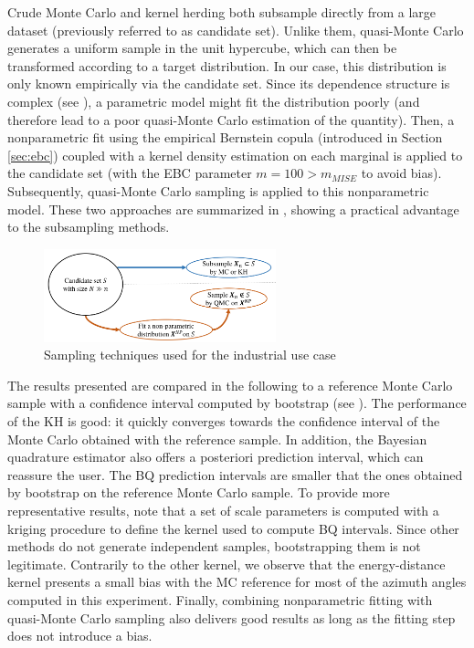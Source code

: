 Crude Monte Carlo and kernel herding both subsample directly from a large dataset (previously referred to as candidate set). 
Unlike them, quasi-Monte Carlo generates a uniform sample in the unit hypercube, which can then be transformed according to a target distribution. 
In our case, this distribution is only known empirically via the candidate set. 
Since its dependence structure is complex (see ), a parametric model might fit the distribution poorly (and therefore lead to a poor quasi-Monte Carlo estimation of the quantity). 
Then, a nonparametric fit using the empirical Bernstein copula (introduced in Section \ref{sec:ebc}) coupled with a kernel density estimation on each marginal is applied to the candidate set (with the EBC parameter $m=100 > m_{MISE}$ to avoid bias). 
Subsequently, quasi-Monte Carlo sampling is applied to this nonparametric model. 
These two approaches are summarized in , showing a practical advantage to the subsampling methods.

\begin{figure}[!h]
    \centering
    \includegraphics[width=0.6\textwidth]{part2/figures/DCE/diagram_samplings.pdf}
    \caption{Sampling techniques used for the industrial use case}
    \label{fig:sampling_diagram}
\end{figure}

The results presented are compared in the following to a reference Monte Carlo sample with a confidence interval computed by bootstrap (see ). 
The performance of the KH is good: it quickly converges towards the confidence interval of the Monte Carlo obtained with the reference sample. 
In addition, the Bayesian quadrature estimator also offers a posteriori prediction interval, which can reassure the user. 
The BQ prediction intervals are smaller that the ones obtained by bootstrap on the reference Monte Carlo sample. 
To provide more representative results, note that a set of scale parameters is computed with a kriging procedure to define the kernel used to compute BQ intervals. 
Since other methods do not generate independent samples, bootstrapping them is not legitimate. 
Contrarily to the other kernel, we observe that the energy-distance kernel presents a small bias with the MC reference for most of the azimuth angles computed in this experiment. 
Finally, combining nonparametric fitting with quasi-Monte Carlo sampling also delivers good results as long as the fitting step does not introduce a bias. 


